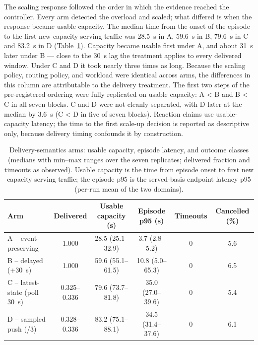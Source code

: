 The scaling response followed the order in which the evidence reached the
controller. Every arm detected the overload and scaled; what differed is when
the response became usable capacity. The median time from the onset of the
episode to the first new capacity serving traffic was 28.5~s in A, 59.6~s in
B, 79.6~s in C and 83.2~s in D (Table~\ref{tab:rq1_arms}). Capacity became
usable first under A, and about 31~s later under B --- close to the 30~s lag
the treatment applies to every delivered window. Under C and D it took nearly
three times as long. Because the scaling policy, routing policy, and workload
were identical across arms, the differences in this column are attributable
to the delivery treatment. The first two steps of the pre-registered ordering
were fully replicated on usable capacity: A < B and B < C in all seven blocks. C and D were not
cleanly separated, with D later at the median by 3.6~s (C < D in five of
seven blocks). Reaction claims use usable-capacity latency; the time to the
first scale-up decision is reported as descriptive only, because delivery
timing confounds it by construction.

\begin{table}[htbp]
    \centering
    \caption{Delivery-semantics arms: usable capacity, episode latency, and
    outcome classes (medians with min--max ranges over the seven replicates;
    delivered fraction and timeouts as observed). Usable capacity is the time
    from episode onset to first new capacity serving traffic; the episode p95
    is the served-basis endpoint latency p95 (per-run mean of the two
    domains).}
    \label{tab:rq1_arms}
    \footnotesize
    \setlength{\tabcolsep}{2pt}
    \begin{tabular}{l c c c c c}
        \toprule
        Arm & Delivered & Usable capacity (s) & Episode p95 (s) & Timeouts & Cancelled (\%) \\
        \midrule
        A -- event-preserving & 1.000 & 28.5 (25.1--32.9) & 3.7 (2.8--5.2) & 0 & 5.6 \\
        B -- delayed (+30~s) & 1.000 & 59.6 (55.1--61.5) & 10.8 (5.0--65.3) & 0 & 6.5 \\
        C -- latest-state (poll 30~s) & 0.325--0.336 & 79.6 (73.7--81.8) & 35.0 (27.0--39.6) & 0 & 5.4 \\
        D -- sampled push (/3) & 0.328--0.336 & 83.2 (75.1--88.1) & 34.5 (31.4--37.6) & 0 & 6.1 \\
        \bottomrule
    \end{tabular}
\end{table}

